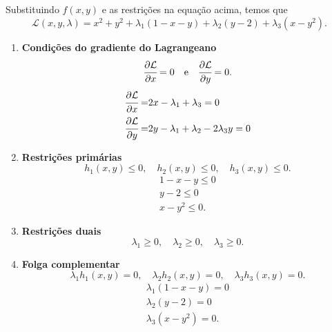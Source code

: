 \documentclass[11pt,a4paper]{article}
\begin{document}
\begin{enumerate}
\begin{itemize}
            Substituindo $f(x,y)$ e as restrições na equação acima, temos que
            \begin{equation*}
                \mathcal{L}(x,y,\lambda) = x^2 + y^2 + \lambda_1(1-x-y) + \lambda_2(y-2) + \lambda_3(x-y^2).
            \end{equation*}

            \begin{enumerate}[label=\Roman*]
                \item \textbf{Condições do gradiente do Lagrangeano}
                \begin{equation*}
                    \cfrac{\partial \mathcal{L}}{\partial x} = 0 \quad \text{e} \quad \cfrac{\partial \mathcal{L}}{\partial y} = 0.
                \end{equation*}
                \begin{align}
                    \cfrac{\partial \mathcal{L}}{\partial x} = & 2x - \lambda_1 + \lambda_3 = 0\label{eq:gradcond-1-q4}\\
                    \cfrac{\partial \mathcal{L}}{\partial y} = & 2y - \lambda_1 + \lambda_2 - 2\lambda_3y = 0\label{eq:gradcond-2-q4}
                \end{align}
                \item \textbf{Restrições primárias}
                \begin{equation*}
                    h_1(x,y) \leq 0, \quad h_2(x,y) \leq 0, \quad h_3(x,y) \leq 0.
                \end{equation*}
                \begin{align}
                        1 - x - y \leq 0\label{eq:restprimal1-q4}\\
                        y - 2 \leq 0\label{eq:restprimal2-q4}\\
                        x - y^2 \leq 0\label{eq:restprimal3-q4}.
                \end{align}
                \item \textbf{Restrições duais}
                \begin{equation*}
                    \lambda_1 \geq 0, \quad \lambda_2 \geq 0, \quad \lambda_3 \geq 0.
                \end{equation*}
                \item \textbf{Folga complementar}
                \begin{equation*}
                    \lambda_1h_1(x,y) = 0, \quad \lambda_2h_2(x,y) = 0, \quad \lambda_3h_3(x,y) = 0.
                \end{equation*}
                \begin{align}
                        \lambda_1(1 - x - y) = 0\label{eq:folga1-q4}\\
                        \lambda_2(y-2) = 0\label{eq:folga2-q4}\\
                        \lambda_3(x - y^2) = 0\label{eq:folga3-q4}.
                \end{align}
            \end{enumerate}


\end{itemize}
\end{enumerate}
\end{document}
